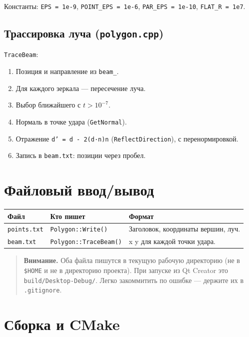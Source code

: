 \documentclass[a4paper,11pt]{article}
\newcommand{\file}[1]{\texttt{#1}}
\newcommand{\code}[1]{\texttt{#1}}
\begin{document}
Константы:
\code{EPS = 1e-9}, \code{POINT\_EPS = 1e-6}, \code{PAR\_EPS = 1e-10},
\code{FLAT\_R = 1e7}.

\subsection{Трассировка луча (\file{polygon.cpp})}

\code{TraceBeam}:
\begin{enumerate}[leftmargin=*]
    \item Позиция и направление из \code{beam\_}.
    \item Для каждого зеркала — пересечение луча.
    \item Выбор ближайшего с $t > 10^{-7}$.
    \item Нормаль в точке удара (\code{GetNormal}).
    \item Отражение \code{d' = d - 2(d·n)n}
          (\code{ReflectDirection}), с перенормировкой.
    \item Запись в \code{beam.txt}: позиции через пробел.
\end{enumerate}

\section{Файловый ввод/вывод}

\begin{longtable}{@{}p{4cm}p{4.5cm}p{6cm}@{}}
\toprule
\textbf{Файл} & \textbf{Кто пишет} & \textbf{Формат} \\ \midrule
\endhead
\file{points.txt} & \code{Polygon::Write()} & Заголовок, координаты вершин, луч. \\
\file{beam.txt} & \code{Polygon::TraceBeam()} & x y для каждой точки удара. \\
\bottomrule
\end{longtable}

\begin{quote}
\textbf{Внимание.} Оба файла пишутся в текущую рабочую директорию
(не в \code{\$HOME} и не в директорию проекта). При запуске из Qt Creator
это \code{build/Desktop-Debug/}. Легко закоммитить по ошибке — держите
их в \code{.gitignore}.
\end{quote}

\section{Сборка и CMake}
\end{document}
